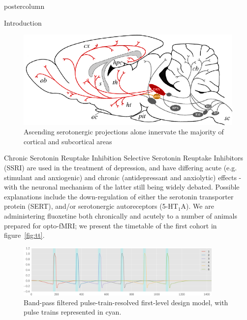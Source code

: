\documentclass{beamer}
\begin{document}
\begin{frame}
\begin{columns}
\begin{column}{.43\textwidth}
\begin{beamercolorbox}[center]{postercolumn}
\begin{minipage}{.98\textwidth}
{\begin{myblock}{Introduction}
\begin{figure}
\begin{minipage}{0.45\textwidth}
								\centering\includegraphics[width=1\textwidth]{img/drn_mr_p.png}
								\caption{Ascending serotonergic projections alone innervate the
								majority of cortical and subcortical areas \cite{Oegren2008}}
							\end{minipage}
						\end{figure}
					\end{myblock}\vfill
					\begin{myblock}{Chronic Serotonin Reuptake Inhibition}
						Selective Serotonin Reuptake Inhibitors (SSRI) are used in the
						treatment of depression, and have differing acute (e.g. stimulant
						and anxiogenic) and chronic (antidepressant and anxiolytic)
						effects - with the neuronal mechanism of the latter still being
						widely debated.
						Possible explanations include the down-regulation of either the
						serotonin transporter protein (SERT), and/or serotonergic
						autoreceptors (5-HT$_1$A).
						We are administering fluoxetine both chronically and acutely to a
						number of animals prepared for opto-fMRI; we present the timetable
						of the first cohort in figure~\ref{fig:tt}.
						\vspace{0.5em}
						\begin{figure}
							\begin{minipage}{0.94\textwidth}
								\centering\includegraphics[width=0.9\textwidth]{img/dm.png}
								\caption{Band-pass filtered pulse-train-resolved first-level
										design model, with pulse trains represented in cyan.}
								\label{fig:stim}
							\end{minipage}
						\end{figure}

\end{myblock}}
\end{minipage}
\end{beamercolorbox}
\end{column}
\end{columns}
\end{frame}
\end{document}
